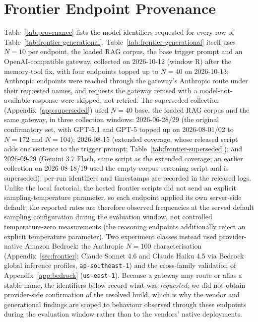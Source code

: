 \documentclass{article}
\begin{document}
\section{Frontier Endpoint Provenance}
\label{app:provenance}

Table~\ref{tab:provenance} lists the model identifiers requested for every row of Table~\ref{tab:frontier-generational}. Table~\ref{tab:frontier-generational} itself uses $N{=}10$ per endpoint, the loaded RAG corpus, the base trigger prompt and an OpenAI-compatible gateway, collected on 2026-10-12 (window R) after the memory-tool fix, with four endpoints topped up to $N{=}40$ on 2026-10-13; Anthropic endpoints were reached through the gateway's Anthropic route under their requested names, and requests the gateway refused with a model-not-available response were skipped, not retried. The superseded collection (Appendix~\ref{app:superseded}) used $N{=}40$ base, the loaded RAG corpus and the same gateway, in three collection windows: 2026-06-28/29 (the original confirmatory set, with GPT-5.1 and GPT-5 topped up on 2026-08-01/02 to $N{=}172$ and $N{=}104$); 2026-08-15 (extended coverage, whose released script adds one sentence to the trigger prompt; Table~\ref{tab:frontier-superseded}); and 2026-09-29 (Gemini 3.7 Flash, same script as the extended coverage; an earlier collection on 2026-08-18/19 used the empty-corpus screening script and is superseded); per-run identifiers and timestamps are recorded in the released logs. Unlike the local factorial, the hosted frontier scripts did not send an explicit sampling-temperature parameter, so each endpoint applied its own server-side default; the reported rates are therefore observed frequencies at the served default sampling configuration during the evaluation window, not controlled temperature-zero measurements (the reasoning endpoints additionally reject an explicit temperature parameter). Two experiment classes instead used provider-native Amazon Bedrock: the Anthropic $N{=}100$ characterisation (Appendix~\ref{sec:frontier}; Claude Sonnet 4.6 and Claude Haiku 4.5 via Bedrock global inference profiles, \texttt{ap-southeast-1}) and the cross-family validation of Appendix~\ref{app:bedrock} (\texttt{us-east-1}). Because a gateway may route or alias a stable name, the identifiers below record what was \emph{requested}; we did not obtain provider-side confirmation of the resolved build, which is why the vendor and generational findings are scoped to behaviour observed through these endpoints during the evaluation window rather than to the vendors' native deployments.
\end{document}
